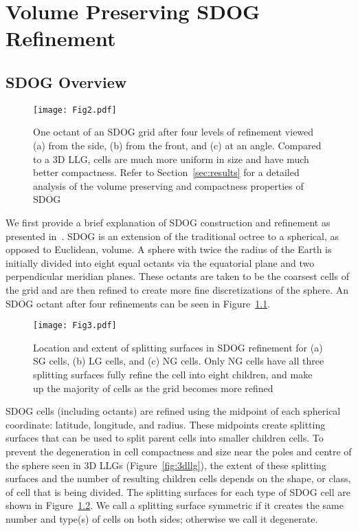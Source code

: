 \chapter{Volume Preserving SDOG Refinement} \label{chap:sdog}


\section{SDOG Overview}

\begin{figure}[tb]
	\texttt{[image: Fig2.pdf]}
	\caption[Title]{
		One octant of an SDOG grid after four levels of refinement viewed (a) from the side, (b) from the front, and (c) at an angle.
		Compared to a 3D LLG, cells are much more uniform in size and have much better compactness.
		Refer to Section~\ref{sec:results} for a detailed analysis of the volume preserving and compactness properties of SDOG
	}
	\label{fig:sdog}
\end{figure}


We first provide a brief explanation of SDOG construction and refinement as presented in~\cite{yu2009sdog}.
SDOG is an extension of the traditional octree to a spherical, as opposed to Euclidean, volume.
A sphere with twice the radius of the Earth is initially divided into eight equal octants via the equatorial plane and two perpendicular meridian planes.
These octants are taken to be the coarsest cells of the grid and are then refined to create more fine discretizations of the sphere.
An SDOG octant after four refinements can be seen in Figure~\ref{fig:sdog}.


\begin{figure}[tb]
	\texttt{[image: Fig3.pdf]}
	\caption[Title]{
		Location and extent of splitting surfaces in SDOG refinement for (a) SG cells, (b) LG cells, and (c) NG cells.
		Only NG cells have all three splitting surfaces fully refine the cell into eight children, and make up the majority of cells as the grid becomes more refined
	}
	\label{fig:subRules}
\end{figure}


SDOG cells (including octants) are refined using the midpoint of each spherical coordinate: latitude, longitude, and radius.
These midpoints create splitting surfaces that can be used to split parent cells into smaller children cells.
To prevent the degeneration in cell compactness and size near the poles and centre of the sphere seen in 3D LLGs (Figure~\ref{fig:3dllg}), the extent of these splitting surfaces and the number of resulting children cells depends on the shape, or class, of cell that is being divided.
The splitting surfaces for each type of SDOG cell are shown in Figure~\ref{fig:subRules}.
We call a splitting surface symmetric if it creates the same number and type(s) of cells on both sides; otherwise we call it degenerate.


